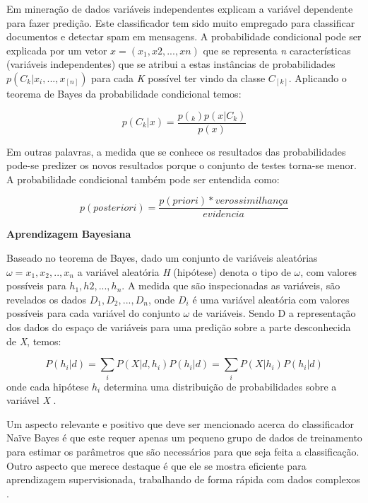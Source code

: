 Em mineração de dados variáveis independentes explicam a variável dependente para fazer predição.
Este classificador tem sido muito empregado para classificar documentos e detectar spam em mensagens. 
A probabilidade condicional pode ser explicada por um vetor $x = (x_{1}, x{2}, ..., x{n})$ que se representa \textit{n} características (variáveis independentes) que se atribui a estas instâncias de probabilidades $p(C_{k}|x_{i},...,x_[n])$ para cada \textit{K} possível ter vindo da classe $C_[k]$. Aplicando o teorema de Bayes da probabilidade condicional temos:

\begin{equation}
p(C_{k}|x) = \frac{p(_{k})p(x|C_{k})}{p(x)}
\end{equation}

Em outras palavras, a medida que se conhece os resultados das probabilidades pode-se predizer os novos resultados porque o conjunto de testes torna-se menor. A probabilidade condicional também pode ser entendida como:

\begin{equation}
p(posteriori) = \frac{p(priori) * verossimilhança}{evidencia}
\end{equation}

\vspace{5mm}

\textbf{Aprendizagem Bayesiana}
\vspace{5mm}

Baseado no teorema de Bayes, dado um conjunto de variáveis aleatórias $\omega = {x_{1}, x_{2},..,x_{n}}$ a variável aleatória \textit{H} (hipótese) denota o tipo de $\omega$, com valores possíveis para $h_{1}, h{2},...,h_{n}$. A medida que são inspecionadas as variáveis, são revelados os dados $D_{1}, D_{2},...,D_{n}$, onde $D_{i}$ é uma variável aleatória com valores possíveis para cada variável do conjunto $\omega$ de variáveis. Sendo D a representação dos dados do espaço de variáveis para uma predição sobre a parte desconhecida de \textit{X}, temos:

\begin{equation}
P(h_{i}|d) = \sum_{i}P(X|d,h_{i})P(h_{i}|d) = \sum_{i}P(X|h_{i})P(h_{i}|d)
\end{equation}
 onde cada hipótese $h_{i}$ determina uma distribuição de probabilidades sobre a variável \textit{X} \cite{NorvigRussel2004}.

Um aspecto relevante e positivo que deve ser mencionado acerca do classificador Naïve Bayes é que este requer apenas um pequeno grupo de dados de treinamento para estimar os parâmetros que são necessários para que seja feita a classificação. Outro aspecto que merece destaque é que ele se mostra eficiente para aprendizagem supervisionada, trabalhando de forma rápida com dados complexos \cite{policarpo2015semantic}.


